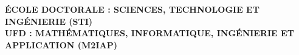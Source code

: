 \begin{titlepage}
\begin{center}
\begin{center}
	\textbf{ÉCOLE DOCTORALE : SCIENCES, TECHNOLOGIE ET INGÉNIERIE (STI)}\\[.09cm]
	\textbf{UFD : MATHÉMATIQUES, INFORMATIQUE, INGÉNIERIE ET APPLICATION (M2IAP)}	
\end{center}







\makebox[\linewidth]{\rule{\textwidth}{0.5pt}}
\begin{center}
	\textbf{\textsc{\color{blue}{ANALYSE APPROFONDIE ET PRÉDICTION DU CHIKUNGUNYA À L'AIDE D'UNE APPROCHE DE RÉGRESSION D'ENSEMBLE\\}}}
\end{center}
\makebox[\linewidth]{\rule{\textwidth}{0.5pt}}


\end{center}
\end{titlepage}
